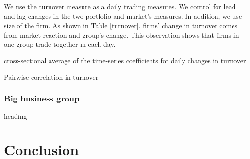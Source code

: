 \documentclass[12pt, a4paper]{article}
\begin{document}
We use the turnover measure as a daily trading measures. We control for lead and lag changes in the two portfolio and market's measures. In addition, we use size of the firm. As shown in Table \ref{turnover}, firms' change in turnover comes from market reaction and group's change. This observation shows that firms in one group trade together in each day. 

\begin{table}[htbp]
	\centering
	\caption{cross-sectional average of the time-series coefficients for daily changes in turnover }
	\resizebox{0.7\textheight}{!}{
		
	} \label{turnover}
\end{table}


\begin{table}[htbp]
	\centering
		\caption{Pairwise correlation in turnover  }
	\resizebox{0.7\textheight}{!}{
		\centering
		
	}
\end{table}


\FloatBarrier


 \subsubsection{Big business group}


		\begin{table}[htbp]
			\centering
			\caption{heading}
			\label{BigBusinessGroup}
			\resizebox{0.8 \textwidth}{!}{
				
			}
		\end{table}

\FloatBarrier
\section{Conclusion}
\end{document}
